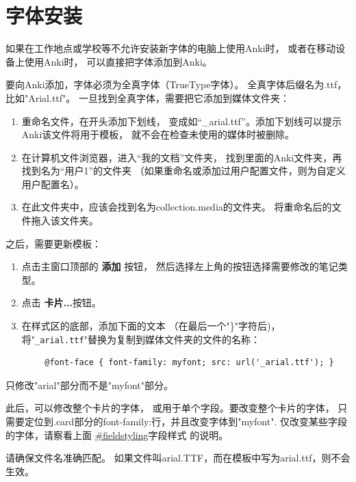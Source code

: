 \documentclass[a4paper]{book}
\begin{document}
	\section{字体安装}\label{installingfonts}
	
	如果在工作地点或学校等不允许安装新字体的电脑上使用Anki时， 或者在移动设备上使用Anki时， 可以直接把字体添加到Anki。
	
	要向Anki添加，字体必须为全真字体（TrueType字体）。 全真字体后缀名为.ttf，比如"Arial.ttf"。 一旦找到全真字体，需要把它添加到媒体文件夹：
	
	\begin{enumerate}
		\item 重命名文件，在开头添加下划线， 变成如“\_arial.ttf”。添加下划线可以提示Anki该文件将用于模板， 就不会在检查未使用的媒体时被删除。
		\item 在计算机文件浏览器，进入“我的文档”文件夹， 找到里面的Anki文件夹，再找到名为“用户1”的文件夹 （如果重命名或添加过用户配置文件，则为自定义用户配置名）。
		\item 在此文件夹中，应该会找到名为collection.media的文件夹。 将重命名后的文件拖入该文件夹。
	\end{enumerate}
	
	之后，需要更新模板：
	\begin{enumerate}
		\item 点击主窗口顶部的 \textbf{添加} 按钮， 然后选择左上角的按钮选择需要修改的笔记类型。
		\item 点击 \textbf{卡片...}按钮。
		\item 在样式区的底部，添加下面的文本 （在最后一个"\}"字符后)， 将"\verb|_arial.ttf|"替换为复制到媒体文件夹的文件的名称：
	\end{enumerate}
	
	\begin{shaded}\begin{verbatim}
		@font-face { font-family: myfont; src: url('_arial.ttf'); }
		\end{verbatim}\end{shaded}
	
	
	\begin{shaded}
		只修改"arial"部分而不是"myfont"部分。
	\end{shaded}
	
	此后，可以修改整个卡片的字体， 或用于单个字段。要改变整个卡片的字体， 只需要定位到.card部分的font-family:行，并且改变字体到"myfont". 仅改变某些字段的字体，请察看上面 \url{#fieldstyling}字段样式 的说明。
	
	
	\begin{shaded}
		请确保文件名准确匹配。 如果文件叫arial.TTF，而在模板中写为arial.ttf，则不会生效。
	\end{shaded}
	
\end{document}
